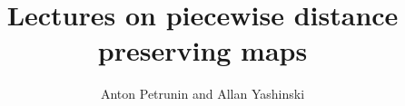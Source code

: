 \documentclass[twoside]{book}
\begin{document}
\title{Lectures on piecewise distance preserving maps}
\author{Anton Petrunin and Allan Yashinski}
\date{}
\maketitle



\newpage


\end{document}
